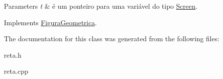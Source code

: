 \begin{DoxyParams}{Parameters}
{\em t} & é um ponteiro para uma variável do tipo \hyperlink{classScreen}{Screen}. \\
\hline
\end{DoxyParams}


Implements \hyperlink{classFiguraGeometrica_a8ee8dedc060b6059a805ea091aef2c41}{Figura\+Geometrica}.



The documentation for this class was generated from the following files\+:\begin{DoxyCompactItemize}
\item 
reta.\+h\item 
reta.\+cpp\end{DoxyCompactItemize}
